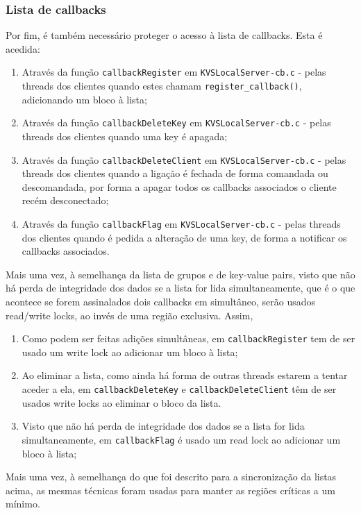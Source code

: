 \subsubsection{Lista de callbacks}
Por fim, é também necessário proteger o acesso à lista de callbacks. Esta é acedida:
\begin{enumerate}[noitemsep]
    \item Através da função \texttt{callbackRegister} em \texttt{KVSLocalServer-cb.c} - pelas threads dos clientes quando estes chamam \texttt{register\_callback()}, adicionando um bloco à lista;
    \item Através da função \texttt{callbackDeleteKey} em \texttt{KVSLocalServer-cb.c} - pelas threads dos clientes quando uma key é apagada;
    \item Através da função \texttt{callbackDeleteClient} em \texttt{KVSLocalServer-cb.c} - pelas threads dos clientes quando a ligação é fechada de forma comandada ou descomandada, por forma a apagar todos os callbacks associados o cliente recém desconectado;
    \item Através da função \texttt{callbackFlag} em \texttt{KVSLocalServer-cb.c} - pelas threads dos clientes quando é pedida a alteração de uma key, de forma a notificar os callbacks associados.
\end{enumerate}
Mais uma vez, à semelhança da lista de grupos e de key-value pairs, visto que não há perda de integridade dos dados se a lista for lida simultaneamente, que é o que acontece se forem assinalados dois callbacks em simultâneo, serão usados read/write locks, ao invés de uma região exclusiva. Assim, 
\begin{enumerate}[noitemsep]
    \item Como podem ser feitas adições simultâneas, em \texttt{callbackRegister} tem de ser usado um write lock ao adicionar um bloco à lista;
    \item Ao eliminar a lista, como ainda há forma de outras threads estarem a tentar aceder a ela, em \texttt{callbackDeleteKey} e \texttt{callbackDeleteClient} têm de ser usados write locks ao eliminar o bloco da lista.
    \item Visto que não há perda de integridade dos dados se a lista for lida simultaneamente, em \phantom{jbjkbjbj} \texttt{callbackFlag} é usado um read lock ao adicionar um bloco à lista;
\end{enumerate}

Mais uma vez, à semelhança do que foi descrito para a sincronização da listas acima, as mesmas técnicas foram usadas para manter as regiões críticas a um mínimo.

